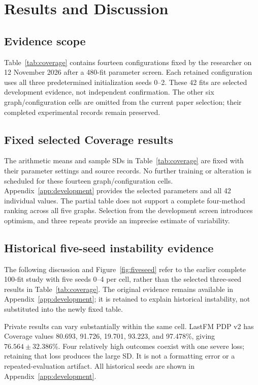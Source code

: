 \chapter{Results and Discussion}\label{ch:results}
\section{Evidence scope}
Table~\ref{tab:coverage} contains fourteen configurations fixed by the researcher on 12 November 2026 after a 480-fit parameter screen. Each retained configuration uses all three predetermined initialization seeds 0--2. These 42 fits are selected development evidence, not independent confirmation. The other six graph/configuration cells are omitted from the current paper selection; their completed experimental records remain preserved.

\section{Fixed selected Coverage results}

The arithmetic means and sample SDs in Table~\ref{tab:coverage} are fixed with their parameter settings and source records. No further training or alteration is scheduled for these fourteen graph/configuration cells. Appendix~\ref{app:development} provides the selected parameters and all 42 individual values. The partial table does not support a complete four-method ranking across all five graphs. Selection from the development screen introduces optimism, and three repeats provide an imprecise estimate of variability.

\section{Historical five-seed instability evidence}
The following discussion and Figure~\ref{fig:fiveseed} refer to the earlier complete 100-fit study with five seeds 0--4 per cell, rather than the selected three-seed results in Table~\ref{tab:coverage}. The original evidence remains available in Appendix~\ref{app:development}; it is retained to explain historical instability, not substituted into the newly fixed table.

Private results can vary substantially within the same cell. LastFM PDP v2 has Coverage values 80.693, 91.726, 19.701, 93.223, and 97.478\%, giving $76.564\pm32.386$\%. Four relatively high outcomes coexist with one severe loss; retaining that loss produces the large SD. It is not a formatting error or a repeated-evaluation artifact. All historical seeds are shown in Appendix~\ref{app:development}.

